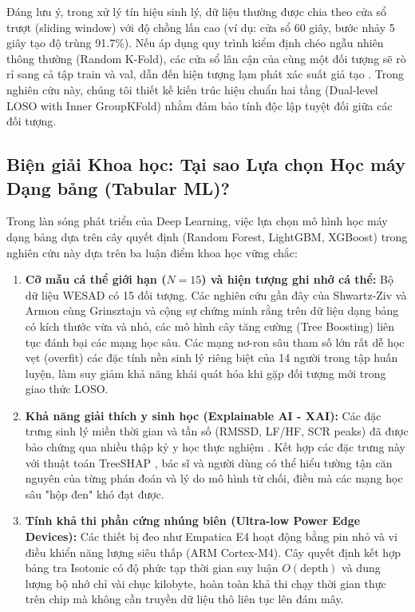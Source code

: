\documentclass[conference]{IEEEtran}
\begin{document}
Đáng lưu ý, trong xử lý tín hiệu sinh lý, dữ liệu thường được chia theo cửa sổ trượt (sliding window) với độ chồng lấn cao (ví dụ: cửa sổ 60 giây, bước nhảy 5 giây tạo độ trùng 91.7\%). Nếu áp dụng quy trình kiểm định chéo ngẫu nhiên thông thường (Random K-Fold), các cửa sổ lân cận của cùng một đối tượng sẽ rò rỉ sang cả tập train và val, dẫn đến hiện tượng lạm phát xác suất giả tạo \cite{can2019stress}. Trong nghiên cứu này, chúng tôi thiết kế kiến trúc hiệu chuẩn hai tầng (Dual-level LOSO with Inner GroupKFold) nhằm đảm bảo tính độc lập tuyệt đối giữa các đối tượng.

\subsection{Biện giải Khoa học: Tại sao Lựa chọn Học máy Dạng bảng (Tabular ML)?}
Trong làn sóng phát triển của Deep Learning, việc lựa chọn mô hình học máy dạng bảng dựa trên cây quyết định (Random Forest, LightGBM, XGBoost) trong nghiên cứu này dựa trên ba luận điểm khoa học vững chắc:
\begin{enumerate}
    \item \textbf{Cỡ mẫu cá thể giới hạn ($N=15$) và hiện tượng ghi nhớ cá thể:} Bộ dữ liệu WESAD có 15 đối tượng. Các nghiên cứu gần đây của Shwartz-Ziv và Armon \cite{shwartzziv2022tabular} cùng Grinsztajn và cộng sự \cite{grinsztajn2022why} chứng minh rằng trên dữ liệu dạng bảng có kích thước vừa và nhỏ, các mô hình cây tăng cường (Tree Boosting) liên tục đánh bại các mạng học sâu. Các mạng nơ-ron sâu tham số lớn rất dễ học vẹt (overfit) các đặc tính nền sinh lý riêng biệt của 14 người trong tập huấn luyện, làm suy giảm khả năng khái quát hóa khi gặp đối tượng mới trong giao thức LOSO.
    \item \textbf{Khả năng giải thích y sinh học (Explainable AI - XAI):} Các đặc trưng sinh lý miền thời gian và tần số (RMSSD, LF/HF, SCR peaks) đã được bảo chứng qua nhiều thập kỷ y học thực nghiệm \cite{taskforce1996heart, greco2016cvxeda}. Kết hợp các đặc trưng này với thuật toán TreeSHAP \cite{lundberg2017unified}, bác sĩ và người dùng có thể hiểu tường tận căn nguyên của từng phán đoán và lý do mô hình từ chối, điều mà các mạng học sâu "hộp đen" khó đạt được.
    \item \textbf{Tính khả thi phần cứng nhúng biên (Ultra-low Power Edge Devices):} Các thiết bị đeo như Empatica E4 hoạt động bằng pin nhỏ và vi điều khiển năng lượng siêu thấp (ARM Cortex-M4). Cây quyết định kết hợp bảng tra Isotonic có độ phức tạp thời gian suy luận $O(\text{depth})$ và dung lượng bộ nhớ chỉ vài chục kilobyte, hoàn toàn khả thi chạy thời gian thực trên chip mà không cần truyền dữ liệu thô liên tục lên đám mây.
\end{enumerate}
\end{document}

